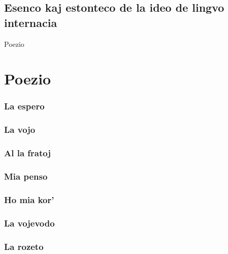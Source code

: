 \documentclass[a5paper,11pt,openany,twoside]{book}
\begin{document}
\section[Esenco kaj estonteco de la ideo de lingvo]{Esenco kaj estonteco de
la ideo de lingvo internacia}
\label{esenco}



 Poezio

\chapter{Poezio}

\subsection{La espero}
\label{laespero}


\subsection{La vojo}
\label{lavojo}


\subsection{Al la fratoj}
\label{allafratoj}


\subsection{Mia penso}
\label{miapenso}


\subsection{Ho mia kor'}
\label{homiakor}


\subsection{La vojevodo}
\label{vojevodo}


\subsection{La rozeto}
\label{rozeto}

\end{document}
